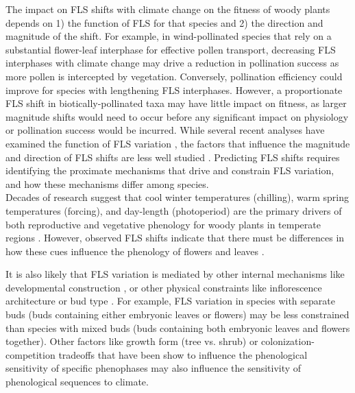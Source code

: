 \documentclass[12pt]{article}\usepackage[]{graphicx}\usepackage[]{color}
\begin{document}
\noindent The impact on FLS shifts with climate change on the fitness of woody plants depends on 1) the function of FLS for that species and 2) the direction and magnitude of the shift. For example, in wind-pollinated species that rely on a substantial flower-leaf interphase for effective pollen transport, decreasing FLS interphases with climate change may drive a reduction in pollination success as more pollen is intercepted by vegetation. Conversely, pollination efficiency could improve for species with lengthening FLS interphases. %
However, a proportionate FLS shift in biotically-pollinated taxa may have little impact on fitness, as larger magnitude shifts would need to occur before any significant impact on physiology or pollination success would be incurred.
\noindent While several recent analyses have examined the function of FLS variation \citep[e.g.][]{Buonaiuto2020, Gougherty2018}, the factors that influence the magnitude and direction of FLS shifts are less well studied  \citep[but see][]{Ma2020:aa}. Predicting FLS shifts requires identifying the proximate mechanisms that drive and constrain FLS variation, and how these mechanisms differ among species.\\
 
\noindent Decades of research suggest that cool winter temperatures (chilling), warm spring temperatures (forcing), and day-length (photoperiod) are the primary drivers of both reproductive and vegetative phenology  for woody plants in temperate regions \citep{Korner:2010aa,Flynn2018}. However, observed FLS shifts indicate that there must be differences in how these cues influence the phenology of flowers and leaves \citep{Buonaiuto2020}.

\noindent It is also likely that FLS variation is mediated by other internal mechanisms like developmental construction \citep{Diggle1995}, or other physical constraints like inflorescence architecture or bud type \citep{Pope2013}. For example, FLS variation in species with separate buds (buds containing either embryonic leaves or flowers) may be less constrained than species with mixed buds (buds containing both embryonic leaves and flowers together). Other factors like growth form (tree vs. shrub) or colonization-competition tradeoffs that have been show to influence the phenological sensitivity of specific phenophases \citep{Basler:2012aa,Donnelly:2021aa} may also influence the sensitivity of phenological sequences to climate.\\
\end{document}
